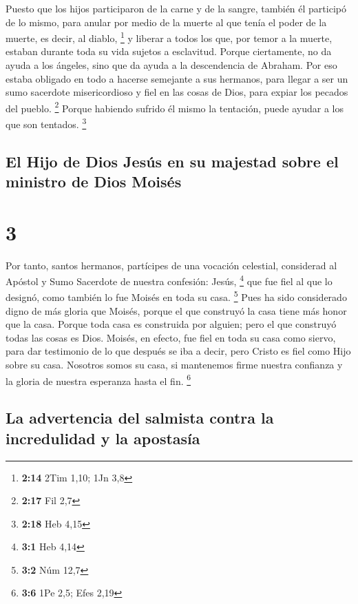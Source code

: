  Puesto que los hijos participaron de la carne y de la
sangre, también él participó de lo mismo, para anular por medio de la
muerte al que tenía el poder de la muerte, es decir, al diablo,
\footnote{\textbf{2:14} 2Tim 1,10; 1Jn 3,8}  y liberar a
todos los que, por temor a la muerte, estaban durante toda su vida
sujetos a esclavitud.  Porque ciertamente, no da ayuda a
los ángeles, sino que da ayuda a la descendencia de Abraham.
 Por eso estaba obligado en todo a hacerse semejante a
sus hermanos, para llegar a ser un sumo sacerdote misericordioso y fiel
en las cosas de Dios, para expiar los pecados del pueblo. \footnote{\textbf{2:17}
  Fil 2,7}  Porque habiendo sufrido él mismo la
tentación, puede ayudar a los que son tentados. \footnote{\textbf{2:18}
  Heb 4,15}

\hypertarget{el-hijo-de-dios-jesuxfas-en-su-majestad-sobre-el-ministro-de-dios-moisuxe9s}{%
\subsection{El Hijo de Dios Jesús en su majestad sobre el ministro de
Dios
Moisés}\label{el-hijo-de-dios-jesuxfas-en-su-majestad-sobre-el-ministro-de-dios-moisuxe9s}}

\hypertarget{section-2}{%
\section{3}\label{section-2}}

 Por tanto, santos hermanos, partícipes de una vocación
celestial, considerad al Apóstol y Sumo Sacerdote de nuestra confesión:
Jesús, \footnote{\textbf{3:1} Heb 4,14}  que fue fiel al
que lo designó, como también lo fue Moisés en toda su casa. \footnote{\textbf{3:2}
  Núm 12,7}  Pues ha sido considerado digno de más gloria
que Moisés, porque el que construyó la casa tiene más honor que la casa.
 Porque toda casa es construida por alguien; pero el que
construyó todas las cosas es Dios.  Moisés, en efecto, fue
fiel en toda su casa como siervo, para dar testimonio de lo que después
se iba a decir,  pero Cristo es fiel como Hijo sobre su
casa. Nosotros somos su casa, si mantenemos firme nuestra confianza y la
gloria de nuestra esperanza hasta el fin. \footnote{\textbf{3:6} 1Pe
  2,5; Efes 2,19}

\hypertarget{la-advertencia-del-salmista-contra-la-incredulidad-y-la-apostasuxeda}{%
\subsection{La advertencia del salmista contra la incredulidad y la
apostasía}\label{la-advertencia-del-salmista-contra-la-incredulidad-y-la-apostasuxeda}}

